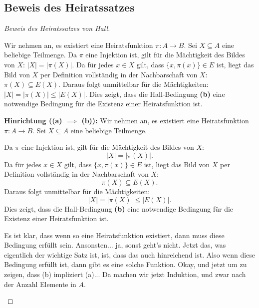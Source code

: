 \subsection{Beweis des Heiratssatzes}

\begin{proof}[Beweis des Heiratssatzes von Hall]
\begin{spoken-clean}[01:12:30 - 01:14:50]
Wir nehmen an, es existiert eine Heiratsfunktion $\pi \colon A \to B$. Sei $X \subseteq A$ eine beliebige Teilmenge. Da $\pi$ eine Injektion ist, gilt für die Mächtigkeit des Bildes von $X$: $|X| = |\pi(X)|$. Da für jedes $x \in X$ gilt, dass $\{x, \pi(x)\} \in E$ ist, liegt das Bild von $X$ per Definition vollständig in der Nachbarschaft von $X$: $\pi(X) \subseteq E(X)$. Daraus folgt unmittelbar für die Mächtigkeiten: $|X| = |\pi(X)| \le |E(X)|$. Dies zeigt, dass die Hall-Bedingung \textbf{(b)} eine notwendige Bedingung für die Existenz einer Heiratsfunktion ist.
\end{spoken-clean}

\begin{ai-global-state-checkpoint-invisible-content}
\end{ai-global-state-checkpoint-invisible-content}

\begin{math-stroke}
\textbf{Hinrichtung (\texorpdfstring{\textbf{(a)} $\implies$ \textbf{(b)}}{a -> b}):}
Wir nehmen an, es existiert eine Heiratsfunktion $\pi \colon A \to B$. Sei $X \subseteq A$ eine beliebige Teilmenge.
        
Da $\pi$ eine Injektion ist, gilt für die Mächtigkeit des Bildes von $X$:
\[
|X| = |\pi(X)|.
\]
Da für jedes $x \in X$ gilt, dass $\{x, \pi(x)\} \in E$ ist, liegt das Bild von $X$ per Definition vollständig in der Nachbarschaft von $X$:
\[
\pi(X) \subseteq E(X).
\]
Daraus folgt unmittelbar für die Mächtigkeiten:
\[
|X| = |\pi(X)| \le |E(X)|.
\]
Dies zeigt, dass die Hall-Bedingung \textbf{(b)} eine notwendige Bedingung für die Existenz einer Heiratsfunktion ist.
\end{math-stroke}

\begin{spoken-clean}[01:14:50 - 01:16:15]
Es ist klar, dass wenn so eine Heiratsfunktion existiert, dann muss diese Bedingung erfüllt sein. Ansonsten... ja, sonst geht's nicht. Jetzt das, was eigentlich der wichtige Satz ist, ist, dass das auch hinreichend ist. Also wenn diese Bedingung erfüllt ist, dann gibt es eine solche Funktion. Okay, und jetzt um zu zeigen, dass (b) impliziert (a)... Da machen wir jetzt Induktion, und zwar nach der Anzahl Elemente in $A$.
\end{spoken-clean}


\end{proof}
